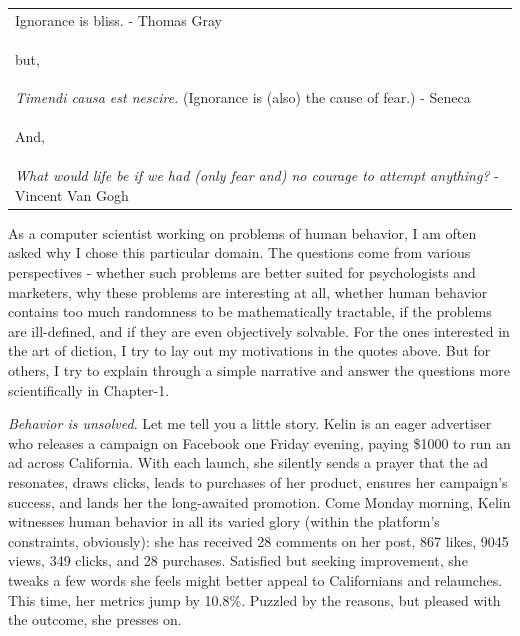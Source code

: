 \documentclass[PhD]{iiitd}
\begin{document}
\begin{table}[!th]
\begin{tabularx}{1\textwidth}{X}
        Ignorance is bliss. - Thomas Gray\\
        
        \begin{center}
                but,
        \end{center}\\

        \textit{Timendi causa est nescire.} (Ignorance is (also) the cause of fear.) - Seneca\\

        \begin{center}
                And,
        \end{center}\\
        
        \textit{What would life be if we had (only fear and) no courage to attempt anything?} - Vincent Van Gogh\\
        
    \end{tabularx}
    
\end{table}


As a computer scientist working on problems of human behavior, I am often asked why I chose this particular domain. The questions come from various perspectives - whether such problems are better suited for psychologists and marketers, why these problems are interesting at all, whether human behavior contains too much randomness to be mathematically tractable, if the problems are ill-defined, and if they are even objectively solvable. For the ones interested in the art of diction, I try to lay out my motivations in the quotes above. But for others, I try to explain through a simple narrative and answer the questions more scientifically in Chapter-1. 



\textit{Behavior is unsolved}. Let me tell you a little story. Kelin is an eager advertiser who releases a campaign on Facebook one Friday evening, paying \$1000 to run an ad across California. With each launch, she silently sends a prayer that the ad resonates, draws clicks, leads to purchases of her product, ensures her campaign's success, and lands her the long-awaited promotion. Come Monday morning, Kelin witnesses human behavior in all its varied glory (within the platform's constraints, obviously): she has received 28 comments on her post, 867 likes, 9045 views, 349 clicks, and 28 purchases. Satisfied but seeking improvement, she tweaks a few words she feels might better appeal to Californians and relaunches. This time, her metrics jump by 10.8\%. Puzzled by the reasons, but pleased with the outcome, she presses on.
\end{document}

